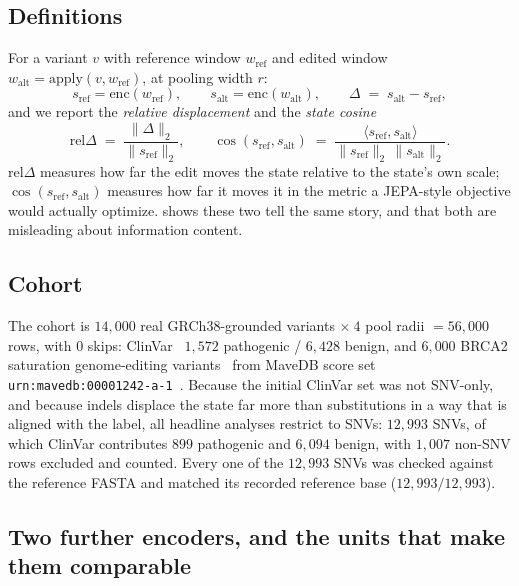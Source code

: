 \documentclass{article}
\newcommand{\enc}{\mathrm{enc}}
\newcommand{\sref}{s_{\mathrm{ref}}}
\newcommand{\salt}{s_{\mathrm{alt}}}
\newcommand{\D}{\Delta}
\newcommand{\wref}{w_{\mathrm{ref}}}
\newcommand{\walt}{w_{\mathrm{alt}}}
\begin{document}
\subsection{Definitions}
For a variant $v$ with reference window $\wref$ and edited window $\walt=\mathrm{apply}(v,\wref)$,
at pooling width $r$:
\begin{equation}
\label{eq:defs}
\sref=\enc(\wref),\qquad
\salt=\enc(\walt),\qquad
\D \;=\; \salt-\sref,
\end{equation}
and we report the \emph{relative displacement} and the \emph{state cosine}
\begin{equation}
\label{eq:geom}
\mathrm{rel}\D \;=\; \frac{\lVert\D\rVert_2}{\lVert\sref\rVert_2},
\qquad
\cos(\sref,\salt)\;=\;\frac{\langle\sref,\salt\rangle}{\lVert\sref\rVert_2\,\lVert\salt\rVert_2}.
\end{equation}
$\mathrm{rel}\D$ measures how far the edit moves the state relative to the state's own scale;
$\cos(\sref,\salt)$ measures how far it moves it in the metric a JEPA-style objective would
actually optimize.  shows these two tell the same story, and that both are
misleading about information content.

\subsection{Cohort}
The cohort is $14{,}000$ real GRCh38-grounded variants $\times\ 4$ pool radii $=56{,}000$ rows, with
$0$ skips: ClinVar~\citep{clinvar2014} $1{,}572$ pathogenic / $6{,}428$ benign, and $6{,}000$ BRCA2
saturation genome-editing variants~\citep{sahu2025} from MaveDB score set
\texttt{urn:mavedb:00001242-a-1}~\citep{mavedb2025}. Because the initial ClinVar set was not
SNV-only, and because indels displace the state far more than substitutions in a way that is aligned
with the label, all headline analyses restrict to SNVs: $12{,}993$ SNVs, of which ClinVar
contributes $899$ pathogenic and $6{,}094$ benign, with $1{,}007$ non-SNV rows excluded and counted.
Every one of the $12{,}993$ SNVs was checked against the reference FASTA and matched its recorded
reference base ($12{,}993/12{,}993$).

\subsection{Two further encoders, and the units that make them comparable}
\label{sec:encoders}
\end{document}
